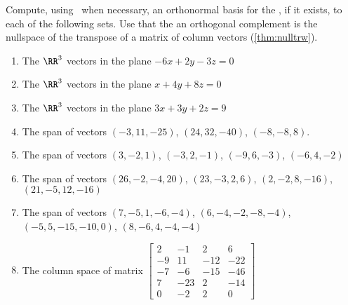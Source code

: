 \begin{exercise} \label{ex:} 
Compute, using \script\ when necessary, an orthonormal basis for the , if it exists, to each of the following sets.
Use that the an orthogonal complement is the nullspace of the transpose of a matrix of column vectors (\autoref{thm:nulltrw}).

\sloppy%
\begin{enumerate}
\item The \(\RR^3\) vectors in the plane \(-6x+2y-3z=0\)

\item The \(\RR^3\) vectors in the plane \(x+4y+8z=0\)

\item The \(\RR^3\) vectors in the plane \(3x+3y+2z=9\)


\item The span of vectors \((-3,11,-25)\), \((24,32,-40)\), \((-8,-8,8)\).

\item The span of vectors \((3,-2,1)\), \((-3,2,-1)\), \((-9,6,-3)\), \((-6,4,-2)\)

\item The span of vectors \((26,-2,-4,20)\), \((23,-3,2,6)\), \((2,-2,8,-16)\), \((21,-5,12,-16)\)

\item The span of vectors \((7,-5,1,-6,-4)\), \((6,-4,-2,-8,-4)\), \((-5,5,-15,-10,0)\), \((8,-6,4,-4,-4)\)

\item The column space of matrix
\(\begin{bmatrix} 2&-1&2&6
\\-9&11&-12&-22
\\-7&-6&-15&-46
\\7&-23&2&-14
\\0&-2&2&0 \end{bmatrix}\)



\end{enumerate}
\end{exercise}
